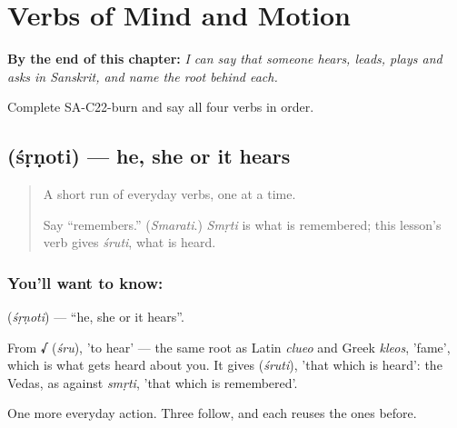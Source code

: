 
\chapter{Verbs of Mind and Motion}
\label{ch:sa-verbs-of-mind}

\begin{chapteropening}
\textbf{By the end of this chapter:} \emph{I can say that someone hears, leads, plays and asks in Sanskrit, and name the root behind each.}

Complete SA-C22-burn and say all four verbs in order.
\end{chapteropening}

\section[\texorpdfstring{\sk{शृणोति} (śṛṇoti)}{शृणोति (śṛṇoti)}]{ (śṛṇoti) — he, she or it hears}

\label{lesson:SA-C22-hear}



\begin{quote}
A short run of everyday verbs, one at a time.

Say \textquotedblleft{}remembers.\textquotedblright{} (\emph{Smarati}.) \emph{Smṛti} is what is remembered; this lesson's verb gives \emph{śruti}, what is heard.
\end{quote}

\subsection*{You'll want to know: }
\textbf{} (\emph{śṛṇoti}) — \textquotedblleft{}he, she or it hears\textquotedblright{}.

From \textbf{√} (\emph{śru}), 'to hear' — the same root as Latin \emph{clueo} and Greek \emph{kleos}, 'fame', which is what gets heard about you. It gives \textbf{} (\emph{śruti}), 'that which is heard': the Vedas, as against \emph{smṛti}, 'that which is remembered'.

\begin{grammarlens}[title={What you've built}]
One more everyday action. Three follow, and each reuses the ones before.
\end{grammarlens}

